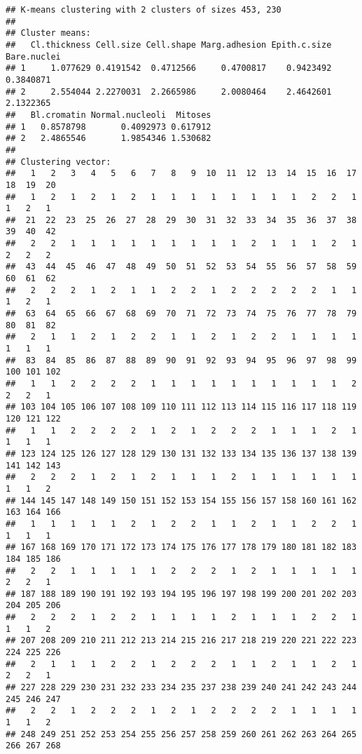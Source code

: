 \documentclass[]{article}
\begin{document}
\begin{verbatim}
## K-means clustering with 2 clusters of sizes 453, 230
## 
## Cluster means:
##   Cl.thickness Cell.size Cell.shape Marg.adhesion Epith.c.size Bare.nuclei
## 1     1.077629 0.4191542  0.4712566     0.4700817    0.9423492   0.3840871
## 2     2.554044 2.2270031  2.2665986     2.0080464    2.4642601   2.1322365
##   Bl.cromatin Normal.nucleoli  Mitoses
## 1   0.8578798       0.4092973 0.617912
## 2   2.4865546       1.9854346 1.530682
## 
## Clustering vector:
##   1   2   3   4   5   6   7   8   9  10  11  12  13  14  15  16  17  18  19  20 
##   1   2   1   2   1   2   1   1   1   1   1   1   1   1   2   2   1   1   2   1 
##  21  22  23  25  26  27  28  29  30  31  32  33  34  35  36  37  38  39  40  42 
##   2   2   1   1   1   1   1   1   1   1   1   2   1   1   1   2   1   2   2   2 
##  43  44  45  46  47  48  49  50  51  52  53  54  55  56  57  58  59  60  61  62 
##   2   2   2   1   2   1   1   2   2   1   2   2   2   2   2   1   1   1   2   1 
##  63  64  65  66  67  68  69  70  71  72  73  74  75  76  77  78  79  80  81  82 
##   2   1   1   2   1   2   2   1   1   2   1   2   2   1   1   1   1   1   1   1 
##  83  84  85  86  87  88  89  90  91  92  93  94  95  96  97  98  99 100 101 102 
##   1   1   2   2   2   2   1   1   1   1   1   1   1   1   1   1   2   2   2   1 
## 103 104 105 106 107 108 109 110 111 112 113 114 115 116 117 118 119 120 121 122 
##   1   1   2   2   2   2   1   2   1   2   2   2   1   1   1   2   1   1   1   1 
## 123 124 125 126 127 128 129 130 131 132 133 134 135 136 137 138 139 141 142 143 
##   2   2   2   1   2   1   2   1   1   1   2   1   1   1   1   1   1   1   1   2 
## 144 145 147 148 149 150 151 152 153 154 155 156 157 158 160 161 162 163 164 166 
##   1   1   1   1   1   2   1   2   2   1   1   2   1   1   2   2   1   1   1   1 
## 167 168 169 170 171 172 173 174 175 176 177 178 179 180 181 182 183 184 185 186 
##   2   2   1   1   1   1   1   2   2   2   1   2   1   1   1   1   1   2   2   1 
## 187 188 189 190 191 192 193 194 195 196 197 198 199 200 201 202 203 204 205 206 
##   2   2   2   1   2   2   1   1   1   1   2   1   1   1   2   2   1   1   1   2 
## 207 208 209 210 211 212 213 214 215 216 217 218 219 220 221 222 223 224 225 226 
##   2   1   1   1   2   2   1   2   2   2   1   1   2   1   1   2   1   2   2   1 
## 227 228 229 230 231 232 233 234 235 237 238 239 240 241 242 243 244 245 246 247 
##   2   2   1   2   2   2   1   2   1   2   2   2   2   1   1   1   1   1   1   2 
## 248 249 251 252 253 254 255 256 257 258 259 260 261 262 263 264 265 266 267 268 

\end{verbatim}
\end{document}
